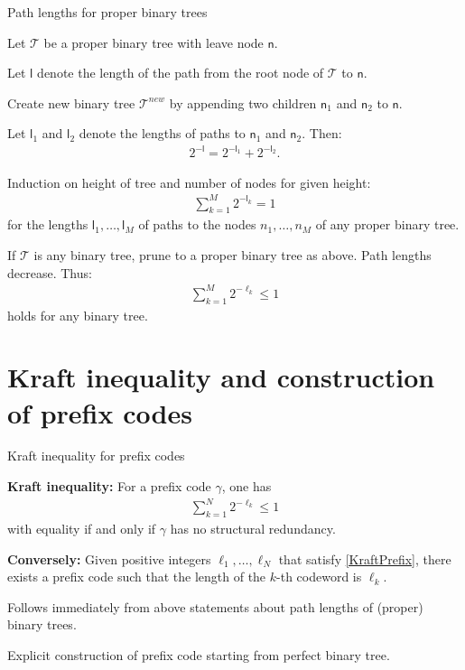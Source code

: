 \begin{frame}{Path lengths for proper binary trees}
\bit
\item Let $\mathcal{T}$ be a proper binary tree with leave node $\mathsf{n}$. 
\bit
\item Let $\mathsf{l}$ denote the length of the path from the root node of $\mathcal{T}$ to $\mathsf{n}$.
\item Create new binary tree $\mathcal{T}^{new}$ by appending two children $\mathsf{n}_1$ and $\mathsf{n}_2$ to
$\mathsf{n}$. 
\item Let $\mathsf{l}_1$ and $\mathsf{l}_2$ denote the lengths of paths to $\mathsf{n}_1$ and $\mathsf{n}_2$. Then:
\begin{align*}
2^{-\mathsf{l}}=2^{-\mathsf{l}_1}+2^{-\mathsf{l}_2}. 
\end{align*}
\eit 
\item [\iarrow] Induction on height of tree and number of nodes for given height: 
\begin{align*}
\sum_{k=1}^M2^{-\mathsf{l}_k}=1
\end{align*} 
for the lengths $\mathsf{l}_1,\dots,\mathsf{l}_M$ of paths to the nodes $n_1,\dots,n_M$ of any proper binary tree. 
\item [\iarrow] If $\mathcal{T}$ is any binary tree, prune to a proper binary tree as above. Path lengths decrease. Thus:  
\begin{align*}
\sum_{k=1}^M2^{-\ell_k}\leq 1
\end{align*}
holds for any binary tree.
\eit 
\end{frame}

\section{Kraft inequality and construction of prefix codes}
\begin{frame}{Kraft inequality for prefix codes} 
\begin{theorem}
\bit 
\item \textbf{Kraft inequality:}
For a prefix code $\gamma$, one has 
\begin{align}\label{KraftPrefix}
\sum_{k=1}^N2^{-\ell_k}\leq 1
\end{align}
with equality if and only if $\gamma$ has no structural redundancy. 
\item \textbf{Conversely:} Given positive integers $\ell_1,\dots,\ell_N$ that satisfy \eqref{KraftPrefix}, there exists a prefix code such that the length of the $k$-th codeword is $\ell_k$. 
\eit 
\end{theorem} 
\bit
\item Follows immediately from above statements about path lengths of (proper) binary trees.
\eit
{}
\bit
\item Explicit construction of prefix code starting from perfect binary tree.
\eit
\end{frame}




